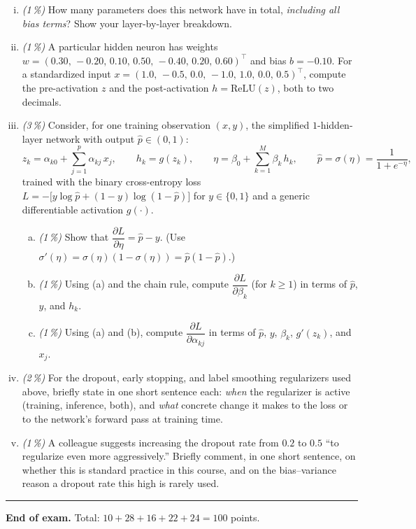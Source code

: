 \documentclass[11pt,a4paper]{article}
\newcommand{\subpoints}[1]{\textit{(#1\,\%)}}
\begin{document}
\begin{enumerate}[(i)]
  \item \subpoints{1} How many parameters does this network have in total, \emph{including all bias terms}? Show your layer-by-layer breakdown.

  \item \subpoints{1} A particular hidden neuron has weights $w = (0.30,\, -0.20,\, 0.10,\, 0.50,\, -0.40,\, 0.20,\, 0.60)^\top$ and bias $b = -0.10$. For a standardized input $x = (1.0,\, -0.5,\, 0.0,\, -1.0,\, 1.0,\, 0.0,\, 0.5)^\top$, compute the pre-activation $z$ and the post-activation $h = \mathrm{ReLU}(z)$, both to two decimals.

  \item \subpoints{3} Consider, for one training observation $(x, y)$, the simplified $1$-hidden-layer network with output $\hat p \in (0, 1)$:
  $$z_k = \alpha_{k0} + \sum_{j=1}^{p} \alpha_{kj}\, x_j, \qquad h_k = g(z_k), \qquad \eta = \beta_0 + \sum_{k=1}^{M} \beta_k\, h_k, \qquad \hat p = \sigma(\eta) = \frac{1}{1 + e^{-\eta}},$$
  trained with the binary cross-entropy loss $L = -\bigl[y \log \hat p + (1 - y) \log(1 - \hat p)\bigr]$ for $y \in \{0, 1\}$ and a generic differentiable activation $g(\cdot)$.

  \begin{enumerate}[(a)]
    \item \subpoints{1} Show that $\dfrac{\partial L}{\partial \eta} = \hat p - y$. (Use $\sigma'(\eta) = \sigma(\eta)(1 - \sigma(\eta)) = \hat p(1 - \hat p)$.)
    \item \subpoints{1} Using (a) and the chain rule, compute $\dfrac{\partial L}{\partial \beta_k}$ (for $k \ge 1$) in terms of $\hat p$, $y$, and $h_k$.
    \item \subpoints{1} Using (a) and (b), compute $\dfrac{\partial L}{\partial \alpha_{kj}}$ in terms of $\hat p$, $y$, $\beta_k$, $g'(z_k)$, and $x_j$.
  \end{enumerate}

  \item \subpoints{2} For the dropout, early stopping, and label smoothing regularizers used above, briefly state in one short sentence each: \emph{when} the regularizer is active (training, inference, both), and \emph{what} concrete change it makes to the loss or to the network's forward pass at training time.

  \item \subpoints{1} A colleague suggests increasing the dropout rate from $0.2$ to $0.5$ ``to regularize even more aggressively.'' Briefly comment, in one short sentence, on whether this is standard practice in this course, and on the bias--variance reason a dropout rate this high is rarely used.
\end{enumerate}

\vspace{1em}
\hrule
\vspace{0.5em}

\noindent\textbf{End of exam.} \quad Total: $10 + 28 + 16 + 22 + 24 = 100$ points.
\end{document}
